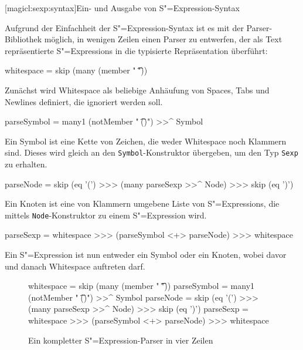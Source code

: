 \documentclass[12pt, a4paper, bibgerm]{scrbook}
\newenvironment{DIFnomarkup}{}{}
\newcommand\icode[1]{\lstinline?#1?}
\newcommand\lsubsection{}
\newcommand{\sexp}{S"=Expression}
\newcommand{\sexps}{S"=Expressions}
\begin{document}
\lsubsection[magicl:sexp:syntax]{Ein- und Ausgabe von \sexp{}-Syntax}

Aufgrund der Einfachheit der \sexp{}-Syntax ist es mit der
Parser-Bibliothek möglich, in wenigen Zeilen einen Parser zu entwerfen,
der als Text repräsentierte \sexps{} in die typisierte Repräsentation
überführt:

\begin{DIFnomarkup}\begin{code}
whitespace = skip (many (member " \t\n"))
\end{code}\end{DIFnomarkup}
Zunächst wird Whitespace als beliebige Anhäufung von Spaces, Tabs und
Newlines definiert, die ignoriert werden soll.
\begin{DIFnomarkup}\begin{code}
parseSymbol = many1 (notMember " \t\n()") >>^ Symbol
\end{code}\end{DIFnomarkup} %
Ein Symbol ist eine Kette von Zeichen, die weder Whitespace noch
Klammern sind. Dieses wird gleich an den \icode{Symbol}-Konstruktor
übergeben, um den Typ \icode{Sexp} zu erhalten.
\begin{DIFnomarkup}\begin{code}
parseNode = skip (eq '(') >>> (many parseSexp >>^ Node) >>> skip (eq ')')
\end{code}\end{DIFnomarkup} %
Ein Knoten ist eine von Klammern umgebene Liste von \sexps{}, die
mittels \icode{Node}-Konstruktor zu einem \sexp{} wird.
\begin{DIFnomarkup}\begin{code}
parseSexp = whitespace >>> (parseSymbol <+> parseNode) >>> whitespace
\end{code}\end{DIFnomarkup} %
Ein \sexp{} ist nun entweder ein Symbol oder ein Knoten, wobei davor und
danach Whitespace auftreten darf.
\begin{figure}[h]
\begin{DIFnomarkup}\begin{code}
whitespace  = skip (many (member " \t\n"))
parseSymbol = many1 (notMember " \t\n()") >>^ Symbol
parseNode   = skip (eq '(') >>> (many parseSexp >>^ Node) >>> skip (eq ')')
parseSexp   = whitespace >>> (parseSymbol <+> parseNode) >>> whitespace    
  \end{code}\end{DIFnomarkup}
  \caption{Ein kompletter \sexp{}-Parser in vier Zeilen}
  \label{magicl:fig:sexp_parser}
\end{figure}
\end{document}
